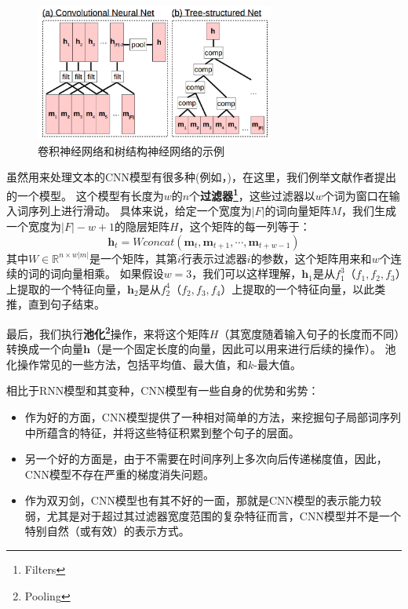 \documentclass[10pt,a4paper]{ctexart}
\begin{document}
\begin{figure}[H]
\centering
\includegraphics[width=0.7\textwidth]{fig25.png}
\caption{卷积神经网络和树结构神经网络的示例}
\label{fig:25}
\end{figure}

虽然用来处理文本的CNN模型有很多种(例如，\cite{kalchbrenner2014convolutional,lei2015molding,kalchbrenner2016neural})，在这里，我们例举文献\cite{kim2014convolutional}作者提出的一个模型。
这个模型有长度为$w$的$n$个\textbf{过滤器\footnote{Filters}}，这些过滤器以$w$个词为窗口在输入词序列上进行滑动。
具体来说，给定一个宽度为$|F|$的词向量矩阵$M$，我们生成一个宽度为$|F|-w+1$的隐层矩阵$H$，这个矩阵的每一列等于：
\begin{equation}\label{eq:68}
 \textbf{h}_t = W concat(\textbf{m}_t,\textbf{m}_{t+1},\cdots,\textbf{m}_{t+w-1})
\end{equation}
其中$W \in \mathbb{R}^{n \times w|m|}$是一个矩阵，其第$i$行表示过滤器$i$的参数，这个矩阵用来和$w$个连续的词的词向量相乘。
如果假设$w=3$，我们可以这样理解，$\textbf{h}_1$是从$f_1^3$（$f_1,f_2,f_3$）上提取的一个特征向量，$\textbf{h}_2$是从$f_2^4$（$f_2,f_3,f_4$）上提取的一个特征向量，以此类推，直到句子结束。

最后，我们执行\textbf{池化\footnote{Pooling}}操作，来将这个矩阵$H$（其宽度随着输入句子的长度而不同）转换成一个向量$\textbf{h}$（是一个固定长度的向量，因此可以用来进行后续的操作）。
池化操作常见的一些方法，包括平均值、最大值，和$k$-最大值\cite{kalchbrenner2014convolutional}。

相比于RNN模型和其变种，CNN模型有一些自身的优势和劣势：
\begin{itemize}
\item 作为好的方面，CNN模型提供了一种相对简单的方法，来挖掘句子局部词序列中所蕴含的特征，并将这些特征积累到整个句子的层面。
\item 另一个好的方面是，由于不需要在时间序列上多次向后传递梯度值，因此，CNN模型不存在严重的梯度消失问题。
\item 作为双刃剑，CNN模型也有其不好的一面，那就是CNN模型的表示能力较弱，尤其是对于超过其过滤器宽度范围的复杂特征而言，CNN模型并不是一个特别自然（或有效）的表示方式。
\end{itemize}
\end{document}
